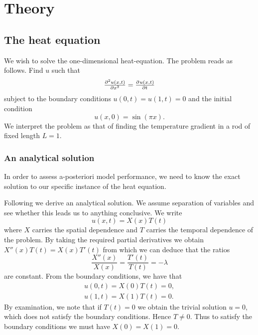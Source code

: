 \documentclass[article, a4paper, oneside]{memoir}
\begin{document}
	\chapter{Theory}

	\section{The heat equation}	

	We wish to solve the one-dimensional heat-equation. The problem reads
	as follows. Find \( u \) such that
	\begin{equation}
		\label{eq:heat_eq}
		\pd[2]{u(x, t)}{x} = \pd{u(x, t)}{t}
	\end{equation}
	subject to the boundary conditions \( u(0, t) = u(1, t) = 0 \) and the
	initial condition
	\begin{equation}
		u(x, 0) = \sin(\pi x).
	\end{equation}
	We interpret the problem as that of finding the temperature gradient in
	a rod of fixed length \( L = 1\).

	\subsection{An analytical solution}
	
	In order to assess a-posteriori model performance, we need to know the
	exact solution to our specific instance of the heat equation.

	Following \cite{hancockLinearPartialDifferential} we derive an
	analytical solution.  We assume separation of variables and see whether
	this leads us to anything conclusive. We write
	\begin{equation}
		u(x, t) = X(x)T(t)
	\end{equation}
	where \( X \) carries the spatial dependence and \( T \) carries the
	temporal dependence of the problem.  By taking the required partial
	derivatives we obtain \(X''(x)T(t) = X(x)T'(t)\) from which we can
	deduce that the ratios
	\begin{equation}
		\label{eq:ratio}
		\frac{X''(x)}{X(x)} = \frac{T'(t)}{T(t)} = -\lambda
	\end{equation}
	are constant. From the boundary conditions, we have that
	\begin{align}
		u(0, t) = X(0)T(t) = 0, \\
		u(1, t) = X(1)T(t) = 0.
	\end{align}
	By examination, we note that if \(T(t) = 0\) we obtain the trivial
	solution \( u = 0\), which does not satisfy the boundary conditions.
	Hence \( T \neq 0 \). Thus to satisfy the boundary conditions we must
	have \( X(0) = X(1) = 0 \).
	
\end{document}
